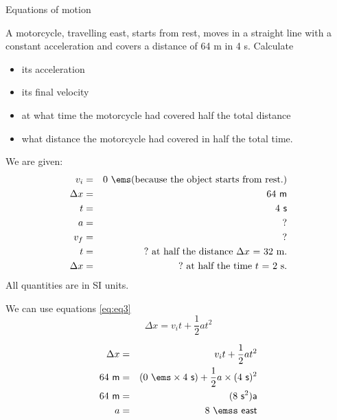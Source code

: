 \begin{wex}
{Equations of motion}{A motorcycle, travelling east, starts from rest, moves in a straight line with a constant acceleration and covers a distance of 64 m in 4 s. Calculate
\begin{itemize}
\item its acceleration
\item its final velocity
\item at what time the motorcycle had covered half the total distance
\item what distance the motorcycle had covered in half the total time.
\end{itemize}}
{
We are given:
\begin{eqnarray*}
v_i&=&0\ \ems \mbox{(because the object starts from rest.)}\\
\Delta x&=&64\ \mathsf{m}\\
t&=&4\ \mathsf{s}\\
a&=&?\\
v_f&=&?\\
t&=&?\ \mbox{at half the distance $\Delta x$~=~32~m.}\\
\Delta x&=&?\ \mbox{at half the time $t$~=~2~s.}
\end{eqnarray*}
All quantities are in SI units.

We can use equations \ref{eq:eq3}
\begin{displaymath}
\Delta x = v_it +\frac{1}{2}at^2
\end{displaymath}

\begin{eqnarray*}
\Delta x &=& v_it +\frac{1}{2}at^2\\
64\ \mathsf{m} &=& (0\ \ems \times 4\ \mathsf{s}) + \frac{1}{2} a \times (4\ \mathsf{s})^2\\
64\ \mathsf{m} &=& (8\ \mathsf{s}^2) \mathsf{a}\\
a &=&8\ \emss~\mathsf{east}
\end{eqnarray*}

}
\end{wex}
